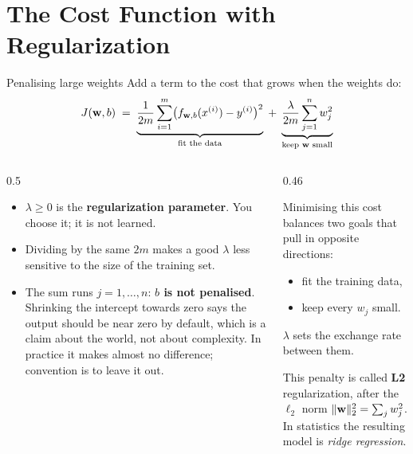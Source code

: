 \documentclass[aspectratio=169,10pt]{beamer}
\begin{document}
\section{The Cost Function with Regularization}

\begin{frame}{Penalising large weights}
  \small
  Add a term to the cost that grows when the weights do:
  \[
    J(\mathbf{w},b) \;=\; \underbrace{\frac{1}{2m}\sum_{i=1}^{m}\bigl(f_{\mathbf{w},b}(x^{(i)})-y^{(i)}\bigr)^2}
      _{\text{fit the data}}
    \;+\; \underbrace{\frac{\lambda}{2m}\sum_{j=1}^{n} w_j^{2}}_{\text{keep } \mathbf{w} \text{ small}}
  \]
  \begin{columns}[T,onlytextwidth]
    \begin{column}{0.5\textwidth}
      \footnotesize
      \begin{itemize}
        \item $\lambda \ge 0$ is the \textbf{regularization parameter}. You choose it; it is
              not learned.
        \item Dividing by the same $2m$ makes a good $\lambda$ less sensitive to the size of
              the training set.
        \item The sum runs $j=1,\dots,n$: \textbf{$b$ is not penalised}. Shrinking the
              intercept towards zero says the output should be near zero by default, which is
              a claim about the world, not about complexity. In practice it makes almost no
              difference; convention is to leave it out.
      \end{itemize}
    \end{column}
    \begin{column}{0.46\textwidth}
      \begin{defnbox}
        \footnotesize
        Minimising this cost balances two goals that pull in opposite directions:
        \begin{itemize}
          \item fit the training data,
          \item keep every $w_j$ small.
        \end{itemize}
        $\lambda$ sets the exchange rate between them.
      \end{defnbox}
      \footnotesize
      This penalty is called \textbf{L2} regularization, after the $\ell_2$ norm
      $\|\mathbf{w}\|_2^2=\sum_j w_j^2$. In statistics the resulting model is \emph{ridge
      regression}.
    \end{column}
  \end{columns}
\end{frame}
\end{document}
